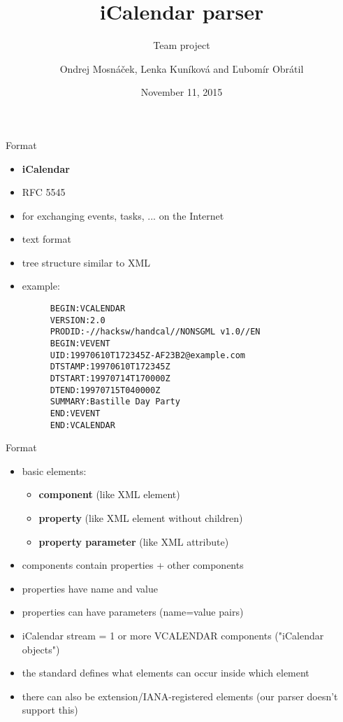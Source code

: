 \documentclass[12pt, t]{beamer}
\author{Ondrej Mosnáček, Lenka Kuníková and Ľubomír Obrátil}
\title{iCalendar parser}
\subtitle{Team project}
\institute{PA193 - Secure coding principles and practices}
\date{November 11, 2015}
\begin{document}
\begin{frame}
\titlepage
\end{frame}

\begin{frame}[fragile]{Format}
\begin{itemize}
\item \textbf{iCalendar}
\item RFC 5545
\item for exchanging events, tasks, ... on the Internet
\item text format
\item tree structure similar to XML
\item example:
\begin{figure}
{\scriptsize
\begin{verbatim}
BEGIN:VCALENDAR
VERSION:2.0
PRODID:-//hacksw/handcal//NONSGML v1.0//EN
BEGIN:VEVENT
UID:19970610T172345Z-AF23B2@example.com
DTSTAMP:19970610T172345Z
DTSTART:19970714T170000Z
DTEND:19970715T040000Z
SUMMARY:Bastille Day Party
END:VEVENT
END:VCALENDAR
\end{verbatim}
}
\end{figure}
\end{itemize}
\end{frame}

\begin{frame}{Format}
\begin{itemize}
\item basic elements:
	\begin{itemize}
	\item \textbf{component} (like XML element)
	\item \textbf{property} (like XML element without children)
	\item \textbf{property parameter} (like XML attribute)
	\end{itemize}
\item components contain properties + other components
\item properties have name and value
\item properties can have parameters (name=value pairs)
\item iCalendar stream = 1 or more VCALENDAR components ("iCalendar objects")
\item the standard defines what elements can occur inside which element
\item there can also be extension/IANA-registered elements (our parser doesn't support this)
\end{itemize}
\end{frame}
\end{document}
